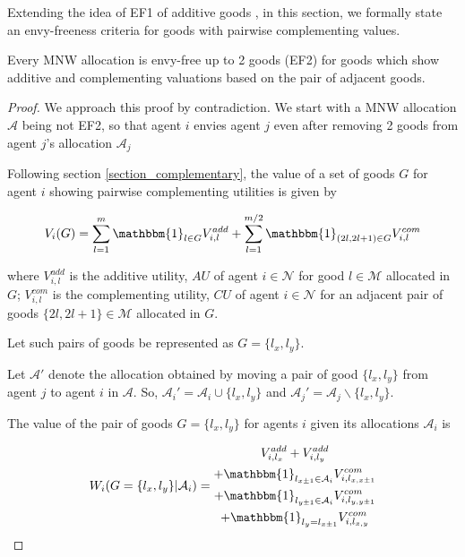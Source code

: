 Extending the idea of EF1 of additive goods \cite{caragiannis2016unreasonable}, in this section, we formally state an envy-freeness criteria for goods with pairwise complementing values.

\begin{theorem}
Every MNW allocation is envy-free up to 2 goods (EF2) for goods which show additive and complementing valuations based on the pair of adjacent goods.
\end{theorem}

\begin{proof}
We approach this proof by contradiction. We start with a MNW allocation $\mathcal{A}$ being not EF2, so that agent $i$ envies agent $j$ even after removing 2 goods from agent $j$'s allocation $\mathcal{A}_j$

Following section \ref{section_complementary}, the value of a set of goods $G$ for agent $i$ showing pairwise complementing utilities is given by

\[
    V_i(G) = \sum_{l=1}^m \mathbbm{1}_{l \in G}V_{i,l}^{add} + \sum_{l=1}^{m/2} \mathbbm{1}_{\left(2l,2l+1\right) \in G}V_{i,l}^{com}
\]

where $V_{i,l}^{add}$ is the additive utility, $AU$ of agent $i \in \mathcal{N}$ for good $l \in \mathcal{M}$ allocated in $G$; $V_{i,l}^{com}$ is the complementing utility, $CU$ of agent $i \in \mathcal{N}$ for an adjacent pair of goods $\{2l,2l+1\} \in \mathcal{M}$ allocated in $G$.

Let such pairs of goods be represented as $G = \{l_x, l_y\}$.

Let $\mathcal{A}'$ denote the allocation obtained by moving a pair of good $\{l_x, l_y\}$ from agent $j$ to agent $i$ in $\mathcal{A}$. So, $\mathcal{A}_i' = \mathcal{A}_i \cup \{l_x, l_y\} $ and $\mathcal{A}_j' = \mathcal{A}_j\backslash \{l_x, l_y\}$.

The value of the pair of goods $G = \{l_x, l_y\}$ for agents $i$ given its allocations $\mathcal{A}_i$ is

\begin{equation}
\label{eq_val_given_alloc_compl}
    W_i(G=\{l_x,l_y\} | \mathcal{A}_i) = 
    \begin{gathered}
        V_{i,l_x}^{add} + V_{i,l_y}^{add} \\
        + \mathbbm{1}_{l_{x \pm 1} \in \mathcal{A}_i}V_{i,l_{x,x\pm 1}}^{com} \\
        + \mathbbm{1}_{l_{y \pm 1} \in \mathcal{A}_i}V_{i,l_{y,y\pm 1}}^{com} \\
        + \mathbbm{1}_{l_y = l_{x \pm 1}}V_{i,l_{x,y}}^{com}
    \end{gathered}
\end{equation}


\end{proof}
